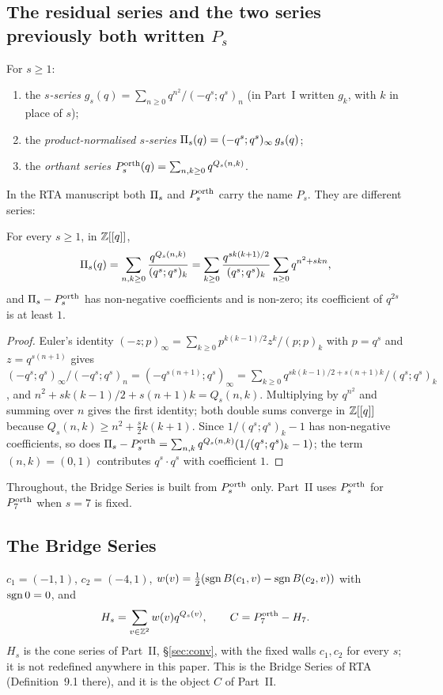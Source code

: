 \subsection{The residual series and the two series previously both written $P_s$}
\begin{definition}\label{def:series}
For $s\ge1$:
\begin{enumerate}[label=(\roman*)]
\item the \emph{$s$-series} $g_s(q)=\sum_{n\ge0}q^{n^2}/(-q^s;q^s)_n$ (in Part~I written $g_k$, with $k$ in place of $s$);
\item the \emph{product-normalised $s$-series} $\Pi_s(q)=(-q^s;q^s)_\infty\,g_s(q)$;
\item the \emph{orthant series} $P^{\mathrm{orth}}_s(q)=\sum_{n,k\ge0}q^{Q_s(n,k)}$.
\end{enumerate}
\end{definition}
In the RTA manuscript both $\Pi_s$ and $P^{\mathrm{orth}}_s$ carry the name $P_s$. They are different series:
\begin{proposition}\label{prop:PiPorth}
For every $s\ge1$, in $\mathbb{Z}[[q]]$,
\[
\Pi_s(q)=\sum_{n,k\ge0}\frac{q^{Q_s(n,k)}}{(q^s;q^s)_k}
=\sum_{k\ge0}\frac{q^{sk(k+1)/2}}{(q^s;q^s)_k}\sum_{n\ge0}q^{n^2+skn},
\]
and $\Pi_s-P^{\mathrm{orth}}_s$ has non-negative coefficients and is non-zero; its coefficient of $q^{2s}$ is at least $1$.
\end{proposition}
\begin{proof}
Euler's identity $(-z;p)_\infty=\sum_{k\ge0}p^{k(k-1)/2}z^k/(p;p)_k$ with $p=q^s$ and $z=q^{s(n+1)}$ gives
$(-q^s;q^s)_\infty/(-q^s;q^s)_n=(-q^{s(n+1)};q^s)_\infty=\sum_{k\ge0}q^{sk(k-1)/2+s(n+1)k}/(q^s;q^s)_k$, and
$n^2+sk(k-1)/2+s(n+1)k=Q_s(n,k)$. Multiplying by $q^{n^2}$ and summing over $n$ gives the first identity; both double sums converge in
$\mathbb{Z}[[q]]$ because $Q_s(n,k)\ge n^2+\tfrac s2k(k+1)$. Since $1/(q^s;q^s)_k-1$ has non-negative coefficients, so does
$\Pi_s-P^{\mathrm{orth}}_s=\sum_{n,k}q^{Q_s(n,k)}(1/(q^s;q^s)_k-1)$; the term $(n,k)=(0,1)$ contributes $q^{s}\cdot q^{s}$ with coefficient $1$.
\end{proof}
Throughout, the Bridge Series is built from $P^{\mathrm{orth}}_s$ only. Part~II uses $P^{\mathrm{orth}}_s$ for $P^{\mathrm{orth}}_7$ when $s=7$ is fixed.

\subsection{The Bridge Series}
$c_1=(-1,1)$, $c_2=(-4,1)$, $w(v)=\tfrac12(\operatorname{sgn} B(c_1,v)-\operatorname{sgn} B(c_2,v))$ with $\operatorname{sgn} 0=0$, and
\[
H_s=\sum_{v\in\mathbb{Z}^2}w(v)q^{Q_s(v)},\qquad C=P^{\mathrm{orth}}_7-H_7 .
\]
$H_s$ is the cone series of Part~II, \S\ref{sec:conv}, with the fixed walls $c_1,c_2$ for every $s$; it is not redefined anywhere in this paper.
This is the Bridge Series of RTA (Definition~9.1 there), and it is the object $C$ of Part~II.

